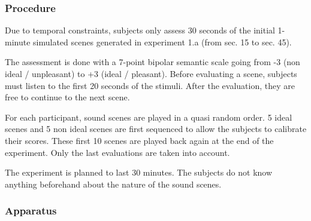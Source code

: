 \documentclass[12pt]{elsarticle}
\begin{document}
\subsubsection*{Procedure}


Due to temporal constraints, subjects only assess 30 seconds of the initial 1-minute simulated scenes generated in experiment 1.a (from sec. 15 to sec. 45).


The assessment is done with a 7-point bipolar semantic scale going from -3 (non ideal / unpleasant) to +3 (ideal / pleasant). Before evaluating a scene, subjects must listen to the first 20 seconds of the stimuli. After the evaluation, they are free to continue to the next scene.


For each participant, sound scenes are played in a quasi random order. 5 ideal scenes and 5 non ideal scenes are first sequenced to allow the subjects to calibrate their scores. These first 10 scenes are played back again at the end of the experiment. Only the last evaluations are taken into account.


The experiment is planned to last 30 minutes. The subjects do not know anything beforehand about the nature of the sound scenes.

\subsubsection*{Apparatus}
\end{document}
